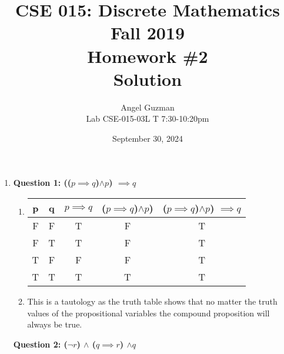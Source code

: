 \documentclass[11pt]{article}
\begin{document}
\author{Angel Guzman\\
Lab CSE-015-03L T 7:30-10:20pm}

\title{CSE 015: Discrete Mathematics\\
Fall 2019\\
Homework \#2\\
Solution}

\date{September 30, 2024
}
\maketitle

\begin{enumerate}

\section{\textbf{Tautologies, Contingencies, and Contradictions}}
\item 

\textbf{Question 1: (($p \implies q$)$\land p$) $\implies q$}

\begin{enumerate}[label=(\alph*)]
\item
\begin{center}
\begin{tabular}{ |c|c|c|c|c| }
 \hline
 p & q & $p \implies q$ & ($p \implies q$)$\land p$) & ($p \implies q$)$\land p$) $\implies q$ \\
 \hline
 F & F & T & F & T \\
 F & T & T & F & T \\
 T & F & F & F & T \\
 T & T & T & T & T \\
 \hline

\end{tabular}
\end{center}

\item 
This is a tautology as the truth table shows that no matter the truth values of the propositional variables the compound proposition will always be true.

\end{enumerate}

\textbf{Question 2: ($\neg r$) $\land$ ($q \implies r$) $\land q$}


\end{enumerate}
\end{document}
